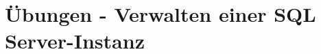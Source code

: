 \clearpage
    \section{\"Ubungen - Verwalten einer SQL Server-Instanz}
      \begin{enumerate}
        

        
        
        
        
        
        
        

        

        

        
        

\end{enumerate}
